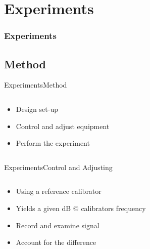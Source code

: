 \section{Experiments}
\begin{frame}
	\frametitle{Experiments}
	\tableofcontents[currentsection]
\end{frame}

\subsection{Method}
\begin{frame}{Experiments}{Method}		
	\begin{columns}
		\begin{column}{0.5\textwidth}
			\begin{itemize}
				\item Design set-up
				\item Control and adjust equipment
				\item Perform the experiment
			\end{itemize}	
		\end{column}
		\begin{column}{0.5\textwidth} 
		\end{column}
	\end{columns}
\end{frame}

\begin{frame}{Experiments}{Control and Adjusting}		
	\begin{columns}
		\begin{column}{0.5\textwidth}
			\begin{itemize}
				\item Using a reference calibrator
				\item Yields a given dB @ calibrators frequency
				\item Record and examine signal
				\item Account for the difference 
			\end{itemize}	
		\end{column}	
		\begin{column}{0.5\textwidth} 
		\end{column}
	\end{columns}
\end{frame}

